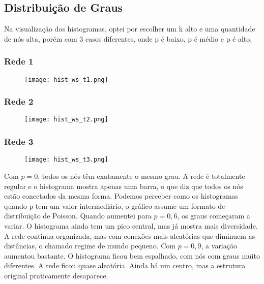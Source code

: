 \documentclass[a4paper]{article}
\begin{document}
\newpage

\subsection*{Distribuição de Graus}

Na visualização dos histogramas, optei por escolher um k alto e uma quantidade de nós alta, porém com 3 casos diferentes, onde p é baixo, p é médio e p é alto.

\subsubsection{Rede 1}

\begin{figure}[h]
\centering
\texttt{[image: hist\_ws\_t1.png]}
\end{figure}

\subsubsection{Rede 2}

\begin{figure}[h]
\centering
\texttt{[image: hist\_ws\_t2.png]}
\end{figure}

\newpage

\subsubsection{Rede 3}

\begin{figure}[h]
\centering
\texttt{[image: hist\_ws\_t3.png]}
\end{figure}

Com $p = 0$, todos os nós têm exatamente o mesmo grau. A rede é totalmente regular e o histograma mostra apenas uma barra, o que diz que todos os nós estão conectados da mesma forma.
Podemos perceber como os histogramas quando p tem um valor intermediário, o gráfico assume um formato de distribuição de Poisson.
Quando aumentei para $p = 0{,}6$, os graus começaram a variar. O histograma ainda tem um pico central, mas já mostra mais diversidade. A rede continua organizada, mas com conexões mais aleatórias que diminuem as distâncias, o chamado regime de mundo pequeno.
Com $p = 0{,}9$, a variação aumentou bastante. O histograma ficou bem espalhado, com nós com graus muito diferentes. A rede ficou quase aleatória. Ainda há um centro, mas a estrutura original praticamente desaparece.
\end{document}
